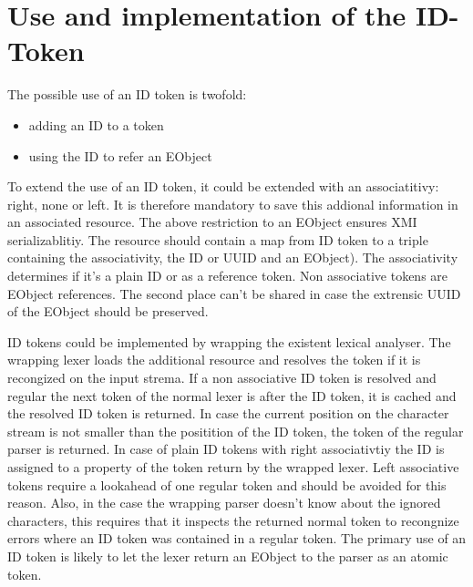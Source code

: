 \section{Use and implementation of the ID-Token}
The possible use of an ID token is twofold:
\begin{itemize}
	\item adding an ID to a token
	\item using the ID to refer an EObject
\end{itemize}
To extend the use of an ID token, it could be extended with an associatitivy: right, none or left.
It is therefore mandatory to save this addional information in an associated resource. The above restriction to an EObject ensures XMI serializablitiy. The resource should contain a map from ID token to a triple containing the associativity, the ID or UUID and an EObject). The associativity determines if it's a plain ID or as a reference token. Non associative tokens are EObject references. The second place can't be shared in case the extrensic UUID of the EObject should be preserved.

ID tokens could be implemented by wrapping the existent lexical analyser. The wrapping lexer loads the additional resource and resolves the token if it is recongized on the input strema. If a non associative ID token is resolved and regular the next token of the normal lexer is after the ID token, it is cached and the resolved ID token is returned. In case the current position on the character stream is not smaller than the positition of the ID token, the token of the regular parser is returned. In case of plain ID tokens with right associativtiy the ID is assigned to a property of the token return by the wrapped lexer. Left associative tokens require a lookahead of one regular token and should be avoided for this reason. Also, in the case the wrapping parser doesn't know about the ignored characters, this requires that it inspects the returned normal token to recongnize errors where an ID token was contained in a regular token. The primary use of an ID token is likely to let the lexer return an EObject to the parser as an atomic token.

